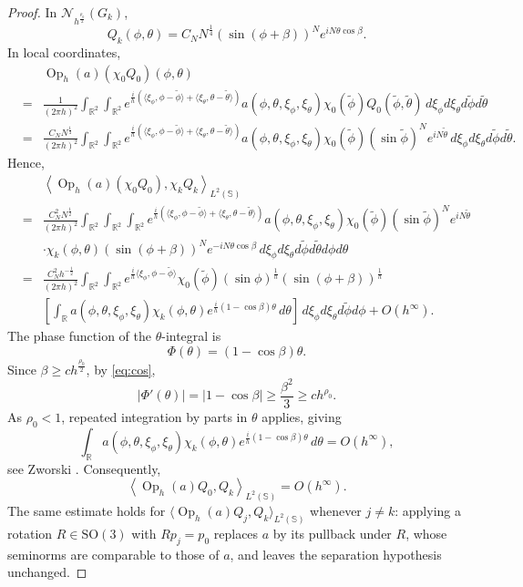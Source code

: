 \documentclass[12pt,reqno]{amsart}
\DeclareMathOperator{\Op}{Op}
\newcommand{\Nc}{\mathcal{N}}
\newcommand{\R}{\mathbb{R}}
\newcommand{\Sb}{\mathbb{S}}
\newcommand{\SO}{\mathrm{SO}}
\theoremstyle{plain}
\theoremstyle{definition}
\theoremstyle{remark}
\numberwithin{equation}{section}
\begin{document}
\begin{proof}
In $\Nc_{h^{\frac{\rho_0}{2}}}(G_k)$,
$$Q_k(\phi,\theta)=C_NN^\frac14\left(\sin(\phi+\beta)\right)^Ne^{iN\theta\cos\beta}.$$
In local coordinates,
\begin{eqnarray*}
&&\Op_h(a)\left(\chi_0Q_0\right)(\phi,\theta)\\
&=&\frac{1}{(2\pi h)^2}\int_{\R^2}\int_{\R^2}e^{\frac ih(\langle\xi_\phi,\phi-\tilde\phi\rangle+\langle\xi_\theta,\theta-\tilde\theta\rangle)}a\left(\phi,\theta,\xi_\phi,\xi_\theta\right)\chi_0(\tilde\phi)Q_0(\tilde\phi,\tilde\theta)\,d\xi_\phi d\xi_\theta d\tilde\phi d\tilde\theta\\
&=&\frac{C_NN^\frac14}{(2\pi h)^2}\int_{\R^2}\int_{\R^2}e^{\frac ih(\langle\xi_\phi,\phi-\tilde\phi\rangle+\langle\xi_\theta,\theta-\tilde\theta\rangle)}a\left(\phi,\theta,\xi_\phi,\xi_\theta\right)\chi_0(\tilde\phi)\left(\sin\tilde\phi\right)^Ne^{iN\tilde\theta}\,d\xi_\phi d\xi_\theta d\tilde\phi d\tilde\theta.
\end{eqnarray*}
Hence,
\begin{eqnarray*}
&&\left\langle\Op_h(a)\left(\chi_0Q_0\right),\chi_kQ_k\right\rangle_{L^2(\Sb)}\\
&=&\frac{C_N^2N^\frac12}{(2\pi h)^2}\int_{\R^2}\int_{\R^2}\int_{\R^2}e^{\frac ih(\langle\xi_\phi,\phi-\tilde\phi\rangle+\langle\xi_\theta,\theta-\tilde\theta\rangle)}a\left(\phi,\theta,\xi_\phi,\xi_\theta\right)\chi_0(\tilde\phi)\left(\sin\tilde\phi\right)^Ne^{iN\tilde\theta}\\
&&\cdot\chi_k(\phi,\theta)\left(\sin(\phi+\beta)\right)^Ne^{-iN\theta\cos\beta}\,d\xi_\phi d\xi_\theta d\tilde\phi d\tilde\theta d\phi d\theta\\
&=&\frac{C_N^2h^{-\frac12}}{(2\pi h)^2}\int_{\R^2}\int_{\R^2}e^{\frac ih\langle\xi_\phi,\phi-\tilde\phi\rangle}\chi_0(\tilde\phi)(\sin\phi)^\frac1h\left(\sin(\phi+\beta)\right)^\frac1h\\
&&\left[\int_\R a\left(\phi,\theta,\xi_\phi,\xi_\theta\right)\chi_k(\phi,\theta)e^{\frac ih(1-\cos\beta)\theta}\,d\theta\right]\,d\xi_\phi d\xi_\theta d\tilde\phi  d\phi+O\left(h^\infty\right).
\end{eqnarray*}
The phase function of the $\theta$-integral is
$$\Phi(\theta)=(1-\cos\beta)\theta.$$
Since $\beta\ge ch^{\frac{\rho_0}{2}}$, by \eqref{eq:cos}, 
$$|\Phi'(\theta)|=|1-\cos\beta|\ge\frac{\beta^2}{3}\ge ch^{\rho_0}.$$
As $\rho_0<1$, repeated integration by parts in $\theta$ applies, giving
$$\int_\R a\left(\phi,\theta,\xi_\phi,\xi_\theta\right)\chi_k(\phi,\theta)e^{\frac ih(1-\cos\beta)\theta}\,d\theta=O\left(h^\infty\right),$$
see Zworski \cite[Lemma 3.14]{Zw}. Consequently,
$$\left\langle\Op_h(a)Q_0,Q_k\right\rangle_{L^2(\Sb)}=O\left(h^\infty\right).$$
The same estimate holds for $\langle\Op_h(a)Q_j,Q_k\rangle_{L^2(\Sb)}$ whenever $j\ne k$: applying a rotation $R\in\SO(3)$ with $Rp_j=p_0$ replaces $a$ by its pullback under $R$, whose seminorms are comparable to those of $a$, and leaves the separation hypothesis unchanged.
\end{proof}
\end{document}

